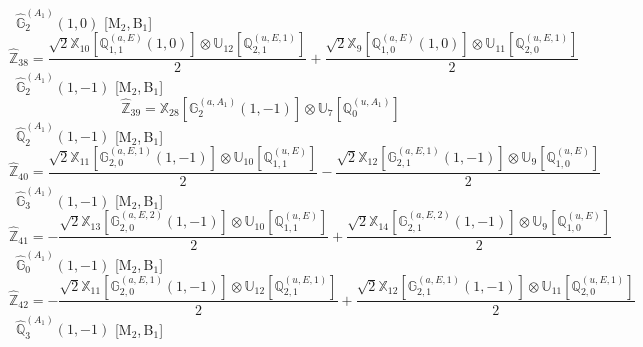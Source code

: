 \documentclass[fleqn,10pt,landscape]{article}
\begin{document}
\begin{itemize}
\begin{dmath*}
\end{dmath*}
\vspace{4mm}
\noindent {} $\,\,\,\hat{\mathbb{G}}_{2}^{(A_{1})}(1,0)$ [M$_{2}$,\,B$_{1}$]
\begin{dmath*}
\hat{\mathbb{Z}}_{38}=\frac{\sqrt{2} \mathbb{X}_{10}[\mathbb{Q}_{1,1}^{(a,E)}(1,0)] \otimes\mathbb{U}_{12}[\mathbb{Q}_{2,1}^{(u,E,1)}]}{2} + \frac{\sqrt{2} \mathbb{X}_{9}[\mathbb{Q}_{1,0}^{(a,E)}(1,0)] \otimes\mathbb{U}_{11}[\mathbb{Q}_{2,0}^{(u,E,1)}]}{2}
\end{dmath*}
\vspace{4mm}
\noindent {} $\,\,\,\hat{\mathbb{G}}_{2}^{(A_{1})}(1,-1)$ [M$_{2}$,\,B$_{1}$]
\begin{dmath*}
\hat{\mathbb{Z}}_{39}=\mathbb{X}_{28}[\mathbb{G}_{2}^{(a,A_{1})}(1,-1)] \otimes\mathbb{U}_{7}[\mathbb{Q}_{0}^{(u,A_{1})}]
\end{dmath*}
\vspace{4mm}
\noindent {} $\,\,\,\hat{\mathbb{Q}}_{2}^{(A_{1})}(1,-1)$ [M$_{2}$,\,B$_{1}$]
\begin{dmath*}
\hat{\mathbb{Z}}_{40}=\frac{\sqrt{2} \mathbb{X}_{11}[\mathbb{G}_{2,0}^{(a,E,1)}(1,-1)] \otimes\mathbb{U}_{10}[\mathbb{Q}_{1,1}^{(u,E)}]}{2} - \frac{\sqrt{2} \mathbb{X}_{12}[\mathbb{G}_{2,1}^{(a,E,1)}(1,-1)] \otimes\mathbb{U}_{9}[\mathbb{Q}_{1,0}^{(u,E)}]}{2}
\end{dmath*}
\vspace{4mm}
\noindent {} $\,\,\,\hat{\mathbb{G}}_{3}^{(A_{1})}(1,-1)$ [M$_{2}$,\,B$_{1}$]
\begin{dmath*}
\hat{\mathbb{Z}}_{41}=- \frac{\sqrt{2} \mathbb{X}_{13}[\mathbb{G}_{2,0}^{(a,E,2)}(1,-1)] \otimes\mathbb{U}_{10}[\mathbb{Q}_{1,1}^{(u,E)}]}{2} + \frac{\sqrt{2} \mathbb{X}_{14}[\mathbb{G}_{2,1}^{(a,E,2)}(1,-1)] \otimes\mathbb{U}_{9}[\mathbb{Q}_{1,0}^{(u,E)}]}{2}
\end{dmath*}
\vspace{4mm}
\noindent {} $\,\,\,\hat{\mathbb{G}}_{0}^{(A_{1})}(1,-1)$ [M$_{2}$,\,B$_{1}$]
\begin{dmath*}
\hat{\mathbb{Z}}_{42}=- \frac{\sqrt{2} \mathbb{X}_{11}[\mathbb{G}_{2,0}^{(a,E,1)}(1,-1)] \otimes\mathbb{U}_{12}[\mathbb{Q}_{2,1}^{(u,E,1)}]}{2} + \frac{\sqrt{2} \mathbb{X}_{12}[\mathbb{G}_{2,1}^{(a,E,1)}(1,-1)] \otimes\mathbb{U}_{11}[\mathbb{Q}_{2,0}^{(u,E,1)}]}{2}
\end{dmath*}
\vspace{4mm}
\noindent {} $\,\,\,\hat{\mathbb{Q}}_{3}^{(A_{1})}(1,-1)$ [M$_{2}$,\,B$_{1}$]

\end{itemize}
\end{document}
